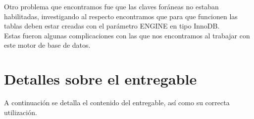 \documentclass[11pt, a4paper, spanish]{article}
\begin{document}
    Otro problema que encontramos fue que las claves for\'aneas no estaban habilitadas, investigando al respecto encontramos que para que funcionen las tablas deben estar creadas con el par\'ametro ENGINE en tipo InnoDB. \\

Estas fueron algunas complicaciones con las que nos encontramos al trabajar con este motor de base de datos.


\newpage 
\section{Detalles sobre el entregable}
A continuaci\'on se detalla el contenido del entregable, as\'i como su correcta utilizaci\'on.\\

\end{document}
